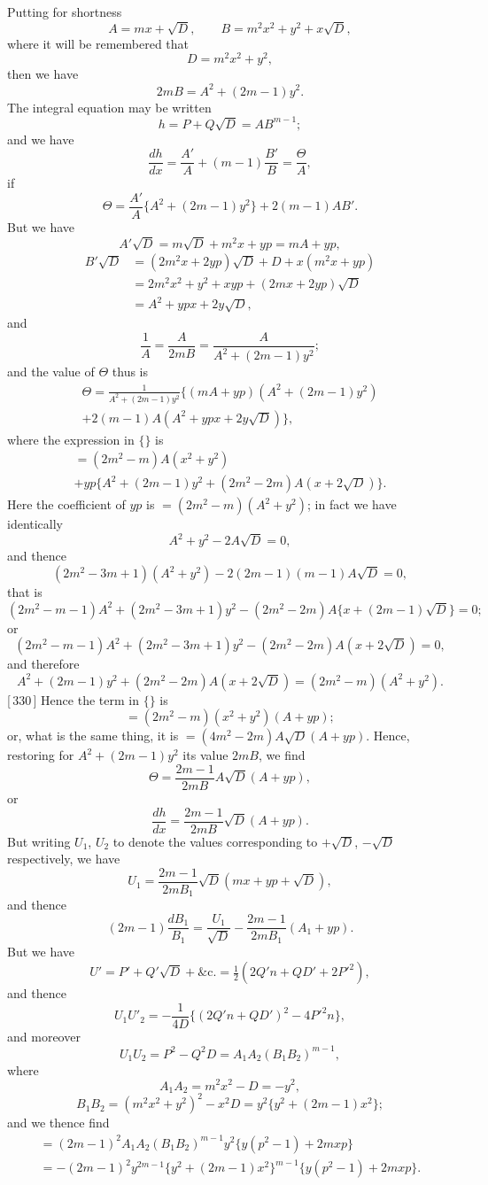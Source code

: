 \documentclass[11pt,a4paper]{article}
\begin{document}
Putting for shortness
\[
A = mx + \sqrt{D}, \qquad B = m^2 x^2 + y^2 + x\sqrt{D},
\]
where it will be remembered that
\[
D = m^2 x^2 + y^2,
\]
then we have
\[
2mB = A^2 + (2m-1)y^2.
\]
The integral equation may be written
\[
h = P + Q\sqrt{D} = AB^{m-1};
\]
and we have
\[
\frac{dh}{dx} = \frac{A'}{A} + (m-1)\frac{B'}{B} = \frac{\Theta}{A},
\]
if
\[
\Theta = \frac{A'}{A}\{A^2 + (2m-1)y^2\} + 2(m-1)AB'.
\]
But we have
\[
A'\sqrt{D} = m\sqrt{D} + m^2 x + yp = mA + yp,
\]
\begin{align*}
B'\sqrt{D} &= (2m^2 x + 2yp)\sqrt{D} + D + x(m^2 x + yp) \\
&= 2m^2 x^2 + y^2 + xyp + (2mx + 2yp)\sqrt{D} \\
&= A^2 + ypx + 2y\sqrt{D},
\end{align*}
and
\[
\frac{1}{A} = \frac{A}{2mB} = \frac{A}{A^2 + (2m-1)y^2};
\]
and the value of $\Theta$ thus is
\begin{multline*}
\Theta = \frac{1}{A^2 + (2m-1)y^2} \Big\{ (mA + yp)(A^2 + (2m-1)y^2) \\
+ 2(m-1)A(A^2 + ypx + 2y\sqrt{D}) \Big\},
\end{multline*}
where the expression in $\{\}$ is
\begin{multline*}
= (2m^2 - m)A(x^2 + y^2) \\
+ yp\{A^2 + (2m-1)y^2 + (2m^2 - 2m)A(x + 2\sqrt{D})\}.
\end{multline*}
Here the coefficient of $yp$ is $=(2m^2 - m)(A^2 + y^2)$; in fact we have identically
\[
A^2 + y^2 - 2A\sqrt{D} = 0,
\]
and thence
\[
(2m^2 - 3m + 1)(A^2 + y^2) - 2(2m-1)(m-1)A\sqrt{D} = 0,
\]
that is
\[
(2m^2 - m - 1)A^2 + (2m^2 - 3m + 1)y^2 - (2m^2 - 2m)A\{x + (2m-1)\sqrt{D}\} = 0;
\]
\newpage
\noindent or
\[
(2m^2 - m - 1)A^2 + (2m^2 - 3m + 1)y^2 - (2m^2 - 2m)A(x + 2\sqrt{D}) = 0,
\]
and therefore
\[
A^2 + (2m-1)y^2 + (2m^2 - 2m)A(x + 2\sqrt{D}) = (2m^2 - m)(A^2 + y^2).
\]
[\,330\,] Hence the term in $\{\}$ is
\[
= (2m^2 - m)(x^2 + y^2)(A + yp);
\]
or, what is the same thing, it is $= (4m^2 - 2m)A\sqrt{D}(A + yp)$. Hence, restoring for $A^2 + (2m-1)y^2$ its value $2mB$, we find
\[
\Theta = \frac{2m-1}{2mB} A\sqrt{D}(A + yp),
\]
or
\[
\frac{dh}{dx} = \frac{2m-1}{2mB} \sqrt{D}(A + yp).
\]
But writing $U_1$, $U_2$ to denote the values corresponding to $+\sqrt{D}$, $-\sqrt{D}$ respectively, we have
\[
U_1 = \frac{2m-1}{2mB_1} \sqrt{D}(mx + yp + \sqrt{D}),
\]
and thence
\[
(2m-1)\frac{dB_1}{B_1} = \frac{U_1}{\sqrt{D}} - \frac{2m-1}{2mB_1}(A_1 + yp).
\]
But we have
\[
U' = P' + Q'\sqrt{D} + \text{\&c.} = \tfrac{1}{2}(2Q'n + QD' + 2P'^2),
\]
and thence
\[
U_1 U'_2 = -\frac{1}{4D}\{(2Q'n + QD')^2 - 4P'^2 n\},
\]
and moreover
\[
U_1 U_2 = P^2 - Q^2 D = A_1 A_2 (B_1 B_2)^{m-1},
\]
where
\[
A_1 A_2 = m^2 x^2 - D = -y^2,
\]
\[
B_1 B_2 = (m^2 x^2 + y^2)^2 - x^2 D = y^2\{y^2 + (2m-1)x^2\};
\]
and we thence find
\begin{multline*}
= (2m-1)^2 A_1 A_2 (B_1 B_2)^{m-1} y^2 \{y(p^2-1) + 2mxp\} \\
= -(2m-1)^2 y^{2m-1} \{y^2 + (2m-1)x^2\}^{m-1} \{y(p^2-1) + 2mxp\}.
\end{multline*}
\end{document}
